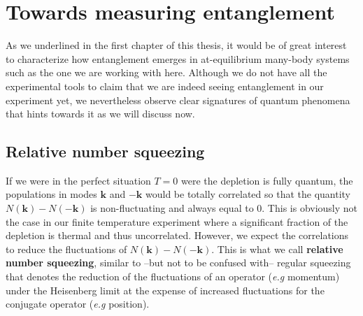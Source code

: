 \section{Towards measuring entanglement}

As we underlined in the first chapter of this thesis, it would be of great interest to characterize how entanglement emerges in at-equilibrium many-body systems such as the one we are working with here. Although we do not have all the experimental tools to claim that we are indeed seeing entanglement in our experiment yet, we nevertheless observe clear signatures of quantum phenomena that hints towards it as we will discuss now.



\subsection{Relative number squeezing}

If we were in the perfect situation $T=0$ were the depletion is fully quantum, the populations in modes $\bm{k}$ and $-\bm{k}$ would be totally correlated so that the quantity $N(\bm{k})-N(-\bm{k})$ is non-fluctuating and always equal to 0. This is obviously not the case in our finite temperature experiment where a significant fraction of the depletion is thermal and thus uncorrelated. However, we expect the \kmk correlations to reduce the fluctuations of $N(\bm{k})-N(-\bm{k})$. This is what we call \textbf{relative number squeezing}, similar to --but not to be confused with-- regular squeezing \cite{walls1983squeezed} that denotes the reduction of the fluctuations of an operator ({\it e.g} momentum) under the Heisenberg limit at the expense of increased fluctuations for the conjugate operator ({\it e.g} position).





